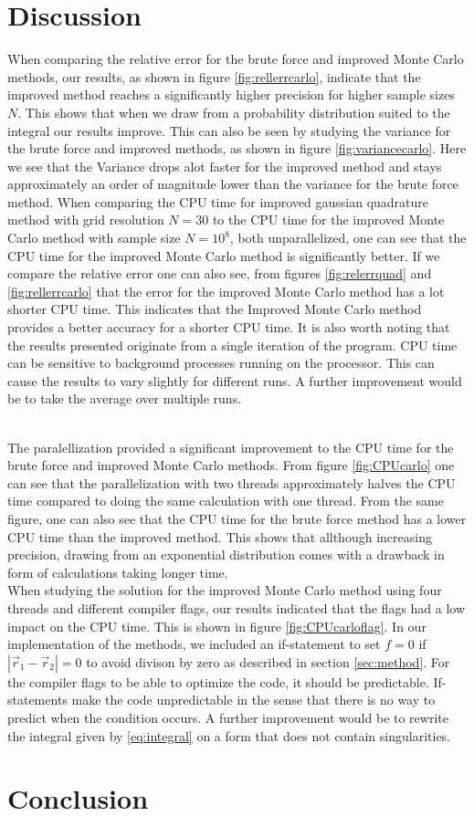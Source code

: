 \documentclass[10pt, twocolumn]{aastex62}
\begin{document}
\section{Discussion} \label{sec:discussion}
When comparing the relative error for the brute force and improved Monte Carlo
methods, our results, as shown in figure \ref{fig:rellerrcarlo}, indicate that the improved method reaches a significantly
higher precision for higher sample sizes $N$. This shows that when we draw from
a probability distribution suited to the integral our results improve. This can
also be seen by studying the variance for the brute force and improved methods,
as shown in figure \ref{fig:variancecarlo}. Here we see that the Variance drops
alot faster for the improved method and stays approximately an order of
magnitude lower than the variance for the brute force method. When comparing the
CPU time for improved gaussian quadrature method with grid resolution $N=30$ to
the CPU time for the improved Monte Carlo method with sample size $N=10^8$, both
unparallelized, one can see that the CPU time for the improved Monte Carlo method is significantly
better. If we compare the relative error one can also see, from figures
\ref{fig:relerrquad} and \ref{fig:rellerrcarlo} that the error for the improved
Monte Carlo method has a lot shorter CPU time. This indicates that the Improved
Monte Carlo method provides a better accuracy for a shorter CPU time. It is also
worth noting that the results presented originate from a single iteration of the
program. CPU time can be sensitive to background processes running on the
processor. This can cause the results to vary slightly for different runs.
A further improvement would be to take the average over multiple runs.\\\\\indent

The paralellization provided a significant improvement to the CPU time for the
brute force and improved Monte Carlo methods. From figure \ref{fig:CPUcarlo} one
can see that the parallelization with two threads approximately halves the CPU
time compared to doing the same calculation with one thread. From the same
figure, one can also see that the CPU time for the brute force method has a lower
CPU time than the improved method. This shows that allthough increasing
precision, drawing from an exponential distribution comes with a drawback
in form of calculations taking longer time.\\
When studying the solution for the improved Monte Carlo method using four
threads and different compiler flags, our results indicated that the flags had a
low impact on the CPU time. This is shown in figure \ref{fig:CPUcarloflag}. In
our implementation of the methods, we included an if-statement to set $f=0$ if
$|\vec{r}_1 - \vec{r}_2| = 0$ to avoid divison by zero as described in section
\ref{sec:method}. For the compiler flags to be able to optimize the code, it
should be predictable. If-statements make the code unpredictable in the sense
that there is no way to predict when the condition occurs. A further improvement
would be to rewrite the integral given by \ref{eq:integral} on a form that does
not contain singularities.



\section{Conclusion} \label{sec:conclusion}
\prntlen{\textwidth}
\nocite{jensen:2019}


\end{document}
